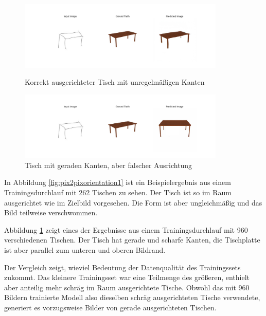 \begin{figure}[h]
	\centering
	\includegraphics[width=0.875\textwidth]{bilder/pix2pix_progress/table_result_orientation1.png}
  \caption[Tisch korrekt ausgerichtet]{Korrekt ausgerichteter Tisch mit unregelmäßigen Kanten}
  \label{fig:pix2pixorientation1}

	\includegraphics[width=0.875\textwidth]{bilder/pix2pix_progress/table_result_orientation2.png}
	\caption[Tisch mit geraden Kanten]{Tisch mit geraden Kanten, aber falscher Ausrichtung}
	\label{fig:pix2pixorientation2}
\end{figure}

In Abbildung \ref{fig:pix2pixorientation1} ist ein Beispielergebnis aus einem Trainingsdurchlauf mit 262 Tischen zu sehen. Der Tisch ist so im Raum ausgerichtet wie im Zielbild vorgesehen. Die Form ist aber ungleichmäßig und das Bild teilweise verschwommen.

Abbildung \ref{fig:pix2pixorientation2} zeigt eines der Ergebnisse aus einem Trainingsdurchlauf mit 960 verschiedenen Tischen. Der Tisch hat gerade und scharfe Kanten, die Tischplatte ist aber parallel zum unteren und oberen Bildrand.

Der Vergleich zeigt, wieviel Bedeutung der Datenqualität des Trainingssets zukommt. Das kleinere Trainingsset war eine Teilmenge des größeren, enthielt aber anteilig mehr schräg im Raum ausgerichtete Tische. Obwohl das mit 960 Bildern trainierte Modell also dieselben schräg ausgerichteten Tische verwendete, generiert es vorzugsweise Bilder von gerade ausgerichteten Tischen.

